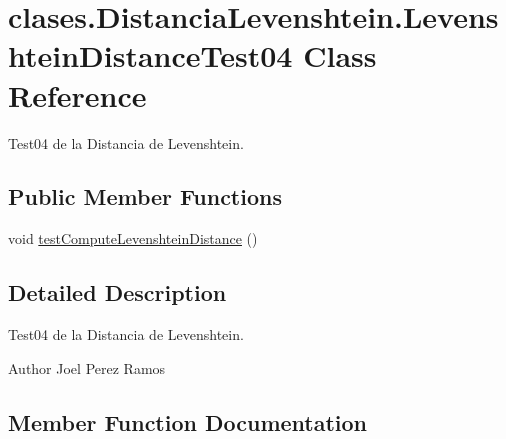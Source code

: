 \hypertarget{classclases_1_1_distancia_levenshtein_1_1_levenshtein_distance_test04}{}\section{clases.\+Distancia\+Levenshtein.\+Levenshtein\+Distance\+Test04 Class Reference}
\label{classclases_1_1_distancia_levenshtein_1_1_levenshtein_distance_test04}


Test04 de la Distancia de Levenshtein.  


\subsection*{Public Member Functions}
\begin{DoxyCompactItemize}
\item 
void \hyperlink{classclases_1_1_distancia_levenshtein_1_1_levenshtein_distance_test04_a066861d7e72c8c5912e032286e892f67}{test\+Compute\+Levenshtein\+Distance} ()
\end{DoxyCompactItemize}


\subsection{Detailed Description}
Test04 de la Distancia de Levenshtein. 

\begin{DoxyAuthor}{Author}
Joel Perez Ramos 
\end{DoxyAuthor}


\subsection{Member Function Documentation}
\hypertarget{classclases_1_1_distancia_levenshtein_1_1_levenshtein_distance_test04_a066861d7e72c8c5912e032286e892f67}{}\label{classclases_1_1_distancia_levenshtein_1_1_levenshtein_distance_test04_a066861d7e72c8c5912e032286e892f67} 
